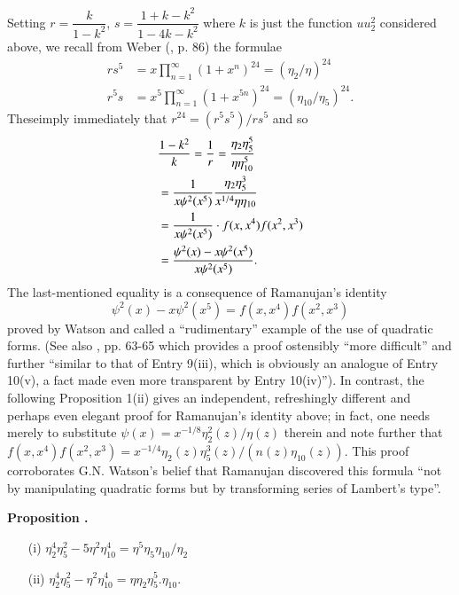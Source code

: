 Setting $r=\dfrac{k}{1-k^{2}}$, $s=\dfrac{1+k-k^{2}}{1-4k-k^{2}}$ where $k$ is just the function $uu^{2}_{2}$ considered above, we recall from Weber (\cite{art8-key14}, p. 86) the formulae 
\begin{align*}
rs^{5} &= x\prod\limits^{\infty}_{n=1}(1+x^{n})^{24}=(\eta_{2}/\eta)^{24}\\
r^{5}s &= x^{5}\prod\limits^{\infty}_{n=1}(1+x^{5n})^{24}=(\eta_{10}/\eta_{5})^{24}.
\end{align*}
These\pageoriginale imply immediately that $r^{24}=(r^{5}s^{5})/rs^{5}$ and so
\begin{align}
& \frac{1-k^{2}}{k} =\frac{1}{r}=\frac{\eta_{2}\eta^{5}_{5}}{\eta\eta^{5}_{10}}\label{art8-eq11}\\
&=\frac{1}{x\psi^{2}(x^{5})}\frac{\eta_{2}\eta^{3}_{5}}{x^{1/4}\eta\eta_{10}}\notag\\
&=\frac{1}{x\psi^{2}(x^{5})}\cdot f(x,x^{4})f(x^{2},x^{3})\notag\\
&=\frac{\psi^{2}(x)-x\psi^{2}(x^{5})}{x\psi^{2}(x^{5})}\label{art8-eq12}.
\end{align}
The last-mentioned equality is a consequence of Ramanujan's identity
$$
\psi^{2}(x)-x\psi^{2}(x^{5})=f(x,x^{4})f(x^{2},x^{3})
$$
proved by Watson \cite{art8-key13} and called a ``rudimentary'' example of the use of quadratic forms. (See also \cite{art8-key1}, pp. 63-65 which provides a proof ostensibly ``more difficult'' and further ``similar to that of Entry 9(iii), which is obviously an analogue of Entry 10(v), a fact made even more transparent by Entry 10(iv)''). In contrast, the following Proposition 1(ii) gives an independent, refreshingly different and perhaps even elegant proof for Ramanujan's identity above; in fact, one needs merely to substitute $\psi(x)=x^{-1/8}\eta^{2}_{2}(z)/\eta(z)$ therein and note further that $f(x,x^{4})f(x^{2},x^{3})=x^{-1/4}\eta_{2}(z)\eta^{3}_{5}(z)/(n(z)\eta_{10}(z))$. This proof corroborates G.N. Watson's belief that Ramanujan discovered this formula ``not by manipulating quadratic forms but by transforming series of Lambert's type''.

\medskip
\noindent
{\bf Proposition .\label{art8-prop1}}
\begin{itemize}
\item[(i)] $\eta^{4}_{2}\eta^{2}_{5}-5\eta^{2}\eta^{4}_{10}=\eta^{5}\eta_{5}\eta_{10}/\eta_{2}$

\item[(ii)] $\eta^{4}_{2}\eta^{2}_{5}-\eta^{2}\eta^{4}_{10}=\eta\eta_{2}\eta^{5}_{5}.\eta_{10}$.
\end{itemize}

